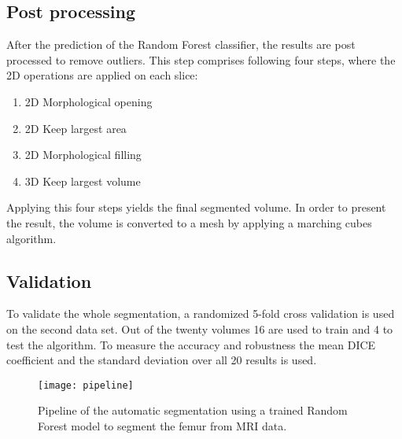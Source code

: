 \subsection{Post processing}
After the prediction of the Random Forest classifier, the results are post processed to remove outliers. This step comprises following four steps, where the 2D operations are applied on each slice:
\begin{enumerate}
\item 2D Morphological opening
\item 2D Keep largest area
\item 2D Morphological filling
\item 3D Keep largest volume
\end{enumerate}
Applying this four steps yields the final segmented volume. In order to present the result, the volume is converted to a mesh by applying a marching cubes algorithm. 
\subsection{Validation}
To validate the whole segmentation, a randomized 5-fold cross validation \cite{cross} is used on the second data set. Out of the twenty volumes 16 are used to train and 4 to test the algorithm. To measure the accuracy and robustness the mean DICE coefficient and the standard deviation over all 20 results is used.
\begin{figure*}[!t]
\centering
\texttt{[image: pipeline]}
\caption{Pipeline of the automatic segmentation using a trained Random Forest model to segment the femur from MRI data.}
\label{fig:pipeline}
\end{figure*}

